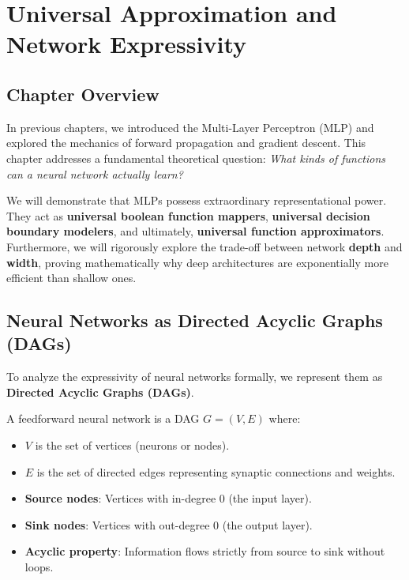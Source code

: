 
\chapter{Universal Approximation and Network Expressivity}
\label{ch:universal_approximation}


\section{Chapter Overview}

In previous chapters, we introduced the Multi-Layer Perceptron (MLP) and explored the mechanics of forward propagation and gradient descent. This chapter addresses a fundamental theoretical question: \textit{What kinds of functions can a neural network actually learn?} 

We will demonstrate that MLPs possess extraordinary representational power. They act as \textbf{universal boolean function mappers}, \textbf{universal decision boundary modelers}, and ultimately, \textbf{universal function approximators}. Furthermore, we will rigorously explore the trade-off between network \textbf{depth} and \textbf{width}, proving mathematically why deep architectures are exponentially more efficient than shallow ones.


\section{Neural Networks as Directed Acyclic Graphs (DAGs)}

To analyze the expressivity of neural networks formally, we represent them as \textbf{Directed Acyclic Graphs (DAGs)}.

\begin{definitionbox}
A feedforward neural network is a DAG $G = (V, E)$ where:
\begin{itemize}
    \item $V$ is the set of vertices (neurons or nodes).
    \item $E$ is the set of directed edges representing synaptic connections and weights. 
    \item \textbf{Source nodes}: Vertices with in-degree 0 (the input layer).
    \item \textbf{Sink nodes}: Vertices with out-degree 0 (the output layer).
    \item \textbf{Acyclic property}: Information flows strictly from source to sink without loops.
\end{itemize}
\end{definitionbox}

